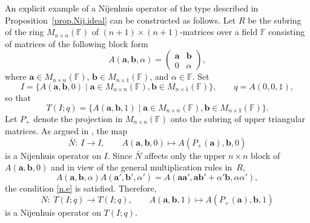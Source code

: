\documentclass[10pt,a4paper]{amsart}
\numberwithin{equation}{section}
\newcommand{\F}{\mathbb F}
\begin{document}
\begin{Example}\label{ex.proj}
An explicit example of a Nijenhuis operator of the type described in Proposition~\ref{prop.Nij.ideal} can be constructed as follows. Let $R$ be the subring of the ring $M_{n\times n}(\F)$ of $(n+1)\times (n+1)$-matrices over a field $\F$ consisting of matrices of the following block form
\[
A(\mathbf{a}, \mathbf{b}, \alpha) =
\begin{pmatrix}
 \mathbf{a} & \mathbf{b}\\
 0 & \alpha
\end{pmatrix},
\]
where $\mathbf{a}\in M_{n\times n}(\F)$, $\mathbf{b}\in M_{n\times 1}(\F)$, and $\alpha \in \F$. Set
\[
I = \{A(\mathbf{a}, \mathbf{b}, 0)\;|\; \mathbf{a}\in M_{n\times n}(\F), \mathbf{b}\in M_{n\times 1}(\F)\}, \qquad q= A(0,0,1),
\]
so that
\[
T(I;q) = \{A(\mathbf{a}, \mathbf{b}, 1)\;|\; \mathbf{a}\in M_{n\times n}(\F), \mathbf{b}\in M_{n\times 1}(\F)\}.
\]
Let $P_+$ denote the projection in $M_{n\times n}(\F)$ onto the subring of upper triangular matrices. As argued in \cite[Example~1]{4}, the map
\[
\bar{N}\colon\ I\to I, \qquad A(\mathbf{a}, \mathbf{b}, 0) \mapsto A(P_+(\mathbf{a}), \mathbf{b}, 0)
\]
is a Nijenhuis operator on $I$. Since $\bar{N}$ affects only the upper $n\times n$ block of $A(\mathbf{a}, \mathbf{b}, 0)$ and in view of the general multiplication rules in~$R$,
\[
A(\mathbf{a}, \mathbf{b}, \alpha)A(\mathbf{a'}, \mathbf{b'}, \alpha') = A(\mathbf{a}\mathbf{a'}, \mathbf{a}\mathbf{b'} +\alpha' \mathbf{b}, \alpha \alpha'),
\]
the condition \eqref{n.e} is satisfied. Therefore,
\[
{N}\colon\ T(I;q) \to T(I;q), \qquad A(\mathbf{a}, \mathbf{b}, 1) \mapsto A(P_+(\mathbf{a}), \mathbf{b}, 1)
\]
is a Nijenhuis operator on $T(I;q)$.
\end{Example}
\end{document}
